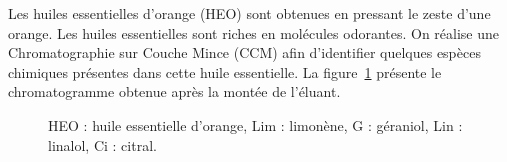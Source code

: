\vspace*{-24pt}

Les huiles essentielles d'orange (HEO) sont obtenues en pressant le zeste d'une orange.
Les huiles essentielles sont riches en molécules odorantes.
On réalise une Chromatographie sur Couche Mince (CCM) afin d'identifier quelques espèces chimiques présentes dans cette huile essentielle.
La figure~\ref{fig:CCM_HEO} présente le chromatogramme obtenue après la montée de l'éluant.

\begin{figure}[!ht]
  \centering
  \caption{
    HEO : huile essentielle d'orange, Lim : limonène, G : géraniol, Lin : linalol, Ci : citral.
  }
  \label{fig:CCM_HEO}
\end{figure}




